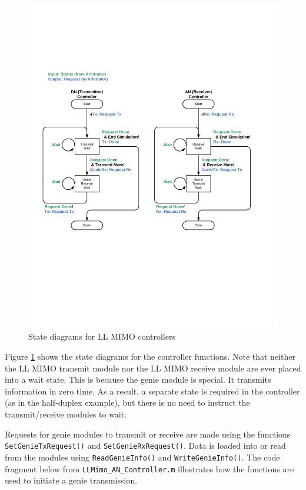 \begin{figure}[h]
\centering
\includegraphics[width=5in]{figs/LL_MIMO_State_Diagram}
\caption{State diagrams for LL MIMO controllers}
\label{fig:llmimoState}
\end{figure}

Figure \ref{fig:llmimoState} shows the state diagrams for the
controller functions.  Note that neither the LL MIMO transmit module
nor the LL MIMO receive module are ever placed into a wait state.
This is because the genie module is special.  It transmits
information in zero time.  As a result, a separate state is required
in the controller (as in the half-duplex example), but there is no
need to instruct the transmit/receive modules to wait.

Requests for genie modules to transmit or receive are made using the
functions \verb+SetGenieTxRequest()+ and \verb+SetGenieRxRequest()+.
Data is loaded into or read from the modules using
\verb+ReadGenieInfo()+ and \verb+WriteGenieInfo()+. The code
fragment below from \verb+LLMimo_AN_Controller.m+ illustrates how
the functions are used to initiate a genie transmission.

